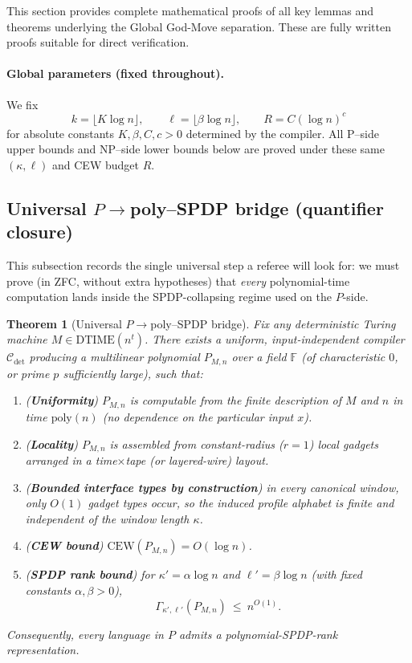 \documentclass[12pt]{article}
\newcommand{\CEW}{\mathrm{CEW}}
\newcommand{\poly}{\mathrm{poly}}
\newcommand{\Compdet}{\mathcal{C}_{\mathrm{det}}}
\newcommand{\F}{\mathbb{F}}
\newtheorem{theorem}{Theorem}
\theoremstyle{definition}
\theoremstyle{definition}
\theoremstyle{remark}
\theoremstyle{remark}
\begin{document}
This section provides complete mathematical proofs of all key lemmas and theorems underlying the Global God-Move separation. These are fully written proofs suitable for direct verification.

\paragraph{Global parameters (fixed throughout).}
We fix
\[
k=\lfloor K\log n\rfloor,\qquad \ell=\lfloor \beta\log n\rfloor,\qquad
R=C(\log n)^c
\]
for absolute constants $K,\beta,C,c>0$ determined by the compiler.
All P--side upper bounds and NP--side lower bounds below are proved under these same
$(\kappa,\ell)$ and CEW budget $R$.

\subsection{Universal $P\to$poly--SPDP bridge (quantifier closure)}
\label{sec:universal-p-to-spdp-bridge}

This subsection records the single universal step a referee will look for:
we must prove (in ZFC, without extra hypotheses) that \emph{every} polynomial-time
computation lands inside the SPDP-collapsing regime used on the $P$-side.

\begin{theorem}[Universal $P\to$poly--SPDP bridge]
\label{thm:universal-p-to-polyspdp}
Fix any deterministic Turing machine $M\in\mathrm{DTIME}(n^t)$.
There exists a \emph{uniform}, \emph{input-independent} compiler
$\Compdet$ producing a multilinear polynomial $P_{M,n}$ over a field $\F$
(of characteristic $0$, or prime $p$ sufficiently large), such that:

\begin{enumerate}[label=(\roman*)]
\item (\textbf{Uniformity}) $P_{M,n}$ is computable from the finite description of $M$
and $n$ in time $\poly(n)$ (no dependence on the particular input $x$).
\item (\textbf{Locality}) $P_{M,n}$ is assembled from constant-radius ($r=1$) local gadgets
arranged in a time$\times$tape (or layered-wire) layout.
\item (\textbf{Bounded interface types by construction}) in every canonical window,
only $O(1)$ gadget types occur, so the induced profile alphabet is finite and
\emph{independent of the window length} $\kappa$.
\item (\textbf{CEW bound}) $\CEW(P_{M,n}) = O(\log n)$.
\item (\textbf{SPDP rank bound}) for $\kappa'=\alpha\log n$ and $\ell'=\beta\log n$
(with fixed constants $\alpha,\beta>0$),
\[
\Gamma_{\kappa',\ell'}(P_{M,n})\ \le\ n^{O(1)}.
\]
\end{enumerate}
Consequently, every language in $P$ admits a polynomial-SPDP-rank representation.
\end{theorem}
\end{document}
